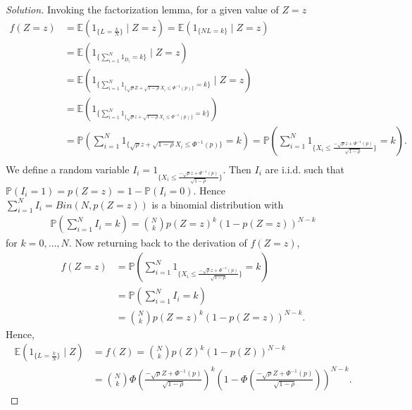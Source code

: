 \documentclass[10pt]{article}
\newcommand{\E}{\mathbb{E}}
\begin{document}
\begin{proof}[Solution]
    Invoking the factorization lemma, for a given value of $Z = z$
    \begin{align*}
        f(Z = z) &= \E \left( 1_{\{L = \frac{k}{N}\}} \mid Z =z \right) = \E \left( 1_{\{NL = k\}} \mid Z = z \right) \\
        &= \E \left( 1_{\{\sum_{i = 1}^{N} 1_{D_i} = k\}} \mid Z = z \right) \\
        &= \E \left( 1_{\{\sum_{i = 1}^{N} 1_{\{ \sqrt{\rho} Z + \sqrt{1 - \rho} X_i \leq \Phi^{-1}(p) \}} = k\}} \mid Z = z \right) \\
        &= \E \left( 1_{\{\sum_{i = 1}^{N} 1_{\{ \sqrt{\rho} z + \sqrt{1 - \rho} X_i \leq \Phi^{-1}(p) \}} = k\}} \right) \\
        &= \mathbb{P} \left( \sum_{i = 1}^{N} 1_{\{ \sqrt{\rho} z + \sqrt{1 - \rho} X_i \leq \Phi^{-1}(p) \}} = k \right) = \mathbb{P} \left( \sum_{i = 1}^{N} 1_{\{ X_i \leq \frac{-\sqrt{\rho} z + \Phi^{-1}(p)}{\sqrt{1 - \rho}} \}} = k \right). \\
    \end{align*}
    We define a random variable $I_i = 1_{\{ X_i \leq \frac{-\sqrt{\rho} z + \Phi^{-1}(p)}{\sqrt{1 - \rho}} \}}$. 
    Then $I_i$ are i.i.d. such that $\mathbb{P}(I_i = 1) = p(Z = z) = 1 - \mathbb{P}(I_i = 0)$.
    Hence $\sum_{i = 1}^{N} I_i = Bin(N, p(Z = z))$ is a binomial distribution with
    \begin{align*}
        \mathbb{P} \left( \sum_{i = 1}^{N} I_i = k \right) = \binom{N}{k} p(Z = z)^k \left( 1 - p(Z = z) \right)^{N-k}
    \end{align*}
    for $k = 0, \ldots, N$. Now returning back to the derivation of $f(Z = z)$,
    \begin{align*}
        f(Z = z) &= \mathbb{P} \left( \sum_{i = 1}^{N} 1_{\{ X_i \leq \frac{-\sqrt{\rho} z + \Phi^{-1}(p)}{\sqrt{1 - \rho}} \}} = k \right) \\
        &= \mathbb{P} \left( \sum_{i = 1}^{N} I_i = k \right) \\
        &= \binom{N}{k} p(Z = z)^k \left( 1 - p(Z = z) \right)^{N-k}.
    \end{align*}
    Hence,
    \begin{align*}
        \E \left( 1_{\{L = \frac{k}{N}\}} \mid Z \right) &= f(Z) = \binom{N}{k} p(Z)^k \left( 1 - p(Z) \right)^{N-k} \\
        &= \binom{N}{k} \Phi \left( \frac{-\sqrt{\rho} Z + \Phi^{-1}(p)}{\sqrt{1 - \rho}} \right)^k \left( 1 - \Phi \left( \frac{-\sqrt{\rho} Z + \Phi^{-1}(p)}{\sqrt{1 - \rho}} \right) \right)^{N-k}.
    \end{align*}
\end{proof}
\end{document}
